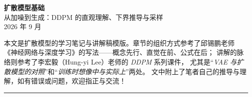 \documentclass[12pt, a4paper]{ctexart}
\newcommand{\doctitle}{扩散模型基础}
\newcommand{\docsubtitle}{从加噪到生成：DDPM 的直观理解、下界推导与采样}
\newcommand{\docdate}{2026 年 9 月}
\newcommand{\docnote}{%
  本文是扩散模型的学习笔记与讲解稿模版。章节的组织方式参考了邱锡鹏老师
  《神经网络与深度学习》的写法——概念先行、直觉在前、公式在后；
  讲解的脉络则参考了李宏毅（Hung-yi Lee）老师的 \emph{DDPM} 系列课件，
  尤其是“\emph{VAE 与扩散模型的对照}”和“\emph{训练时想像中与实际上}”两处。
  文中附上了笔者自己的推导与理解，如有错误或问题，欢迎指正与交流！%
}
\begin{document}
\begin{center}
  {\sffamily\bfseries{} \doctitle}\\[0.85em]
  {\sffamily{} \docsubtitle}\\[0.55em]
  {\sffamily{} \docdate}
\end{center}

\vspace{0.4em}
\docnote

\vspace{0.6em}
\hrule
\vspace{0.6em}










\appendix


\printbibliography[title={参考文献}]
\end{document}
